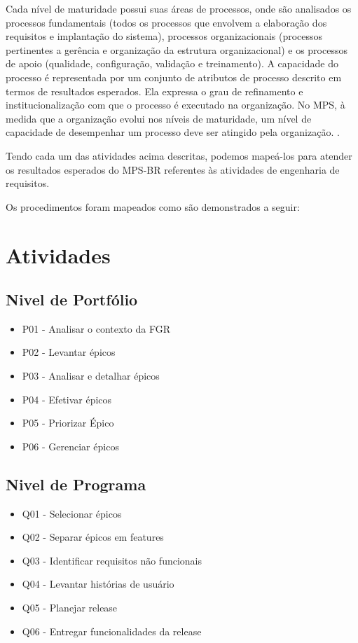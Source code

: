 Cada nível de maturidade possui suas áreas de processos, onde são analisados os processos fundamentais (todos os processos
que envolvem a elaboração dos requisitos e implantação do sistema), processos organizacionais (processos pertinentes a
gerência e organização da estrutura organizacional) e os processos de apoio (qualidade, configuração, validação e treinamento).
A capacidade do processo é representada por um conjunto de atributos de processo descrito em termos de resultados esperados.
Ela expressa o grau de refinamento e institucionalização com que o processo é executado na organização. No MPS, à medida que
a organização evolui nos níveis de maturidade, um nível de capacidade de desempenhar um processo deve ser atingido pela
organização. \cite{guia2012}.

Tendo cada um das atividades acima descritas, podemos mapeá-los para atender os resultados esperados do MPS-BR referentes às
atividades de engenharia de requisitos.

Os procedimentos foram mapeados como são demonstrados a seguir:

\section{Atividades}
	\subsection{Nivel de Portfólio}
		\begin{itemize}
			\item P01 - Analisar o contexto da FGR
			\item P02 - Levantar épicos
			\item P03 - Analisar e detalhar épicos
			\item P04 - Efetivar épicos
			\item P05 - Priorizar Épico
			\item P06 - Gerenciar épicos
		\end{itemize}

	\subsection{Nivel de Programa}
		\begin{itemize}
			\item Q01 - Selecionar épicos
			\item Q02 - Separar épicos em features
			\item Q03 - Identificar requisitos não funcionais
			\item Q04 - Levantar histórias de usuário
			\item Q05 - Planejar release
			\item Q06 - Entregar funcionalidades da release
		\end{itemize}

